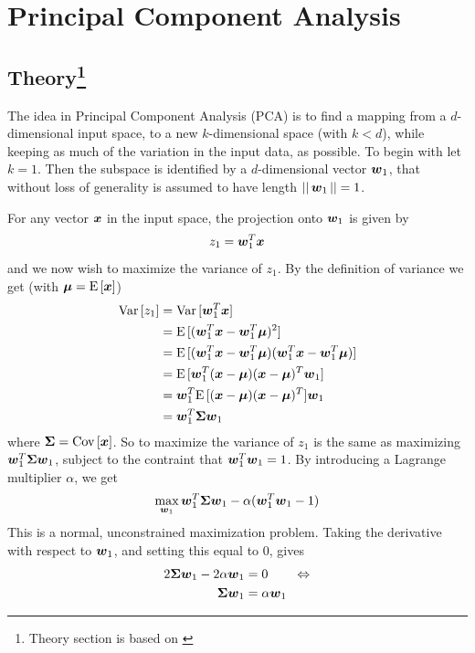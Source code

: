 \section{Principal Component Analysis}

\subsection[Theory]{Theory\protect\footnote{Theory section is based on \citet[p.113]{alpaydin10}}} %
The idea in Principal Component Analysis (PCA) is to find a mapping from a $d$-dimensional input space, to a new $k$-dimensional space (with $k<d$), while keeping as much of the variation in the input data, as possible. To begin with let $k=1$. Then the subspace is identified by a $d$-dimensional vector $\boldsymbol{w}_1$, that without loss of generality is assumed to have length $||\,\boldsymbol{w}_1\,||=1$. \par
For any vector $\boldsymbol{x}$ in the input space, the projection onto $\boldsymbol{w}_1$ is given by
\[
    z_1 = \boldsymbol{w}_1^T \boldsymbol{x}
\]
and we now wish to maximize the variance of $z_1$. By the definition of variance we get (with $\boldsymbol{\mu}=\text{E}\,[\boldsymbol{x}]$)
\begin{align*}
    \text{Var}\,[z_1] &= \text{Var}\,[\boldsymbol{w}_1^T\boldsymbol{x}] \\
    &= \text{E}\,[(\boldsymbol{w}_1^T\boldsymbol{x} - \boldsymbol{w}_1^T\boldsymbol{\mu})^2] \\
    &= \text{E}\,[(\boldsymbol{w}_1^T\boldsymbol{x} - \boldsymbol{w}_1^T\boldsymbol{\mu})(\boldsymbol{w}_1^T\boldsymbol{x} - \boldsymbol{w}_1^T\boldsymbol{\mu})] \\
    &= \text{E}\,[\boldsymbol{w}_1^T(\boldsymbol{x}-\boldsymbol{\mu})(\boldsymbol{x}-\boldsymbol{\mu})^T\boldsymbol{w}_1] \\
    &= \boldsymbol{w}_1^T\text{E}\,[(\boldsymbol{x}-\boldsymbol{\mu})(\boldsymbol{x}-\boldsymbol{\mu})^T]\boldsymbol{w}_1 \\
    &= \boldsymbol{w}_1^T\boldsymbol{\Sigma}\boldsymbol{w}_1
\end{align*}
where $\boldsymbol{\Sigma} = \text{Cov}\,[\boldsymbol{x}]$. So to maximize the variance of $z_1$ is the same as maximizing $\boldsymbol{w}_1^T\boldsymbol{\Sigma}\boldsymbol{w}_1$, subject to the contraint that $\boldsymbol{w}_1^T\boldsymbol{w}_1=1$. By introducing a Lagrange multiplier $\alpha$, we get
\[
    \max_{\boldsymbol{w}_1} \boldsymbol{w}_1^T\boldsymbol{\Sigma}\boldsymbol{w}_1 - \alpha(\boldsymbol{w}_1^T\boldsymbol{w}_1 - 1)
\]
This is a normal, unconstrained maximization problem. Taking the derivative with respect to $\boldsymbol{w}_1$, and setting this equal to 0, gives
\begin{align*}
    2\boldsymbol{\Sigma}\boldsymbol{w}_1 - 2\alpha\boldsymbol{w}_1 &= 0 \quad\quad\Leftrightarrow \\
    \boldsymbol{\Sigma}\boldsymbol{w}_1 &= \alpha\boldsymbol{w}_1
\end{align*}
